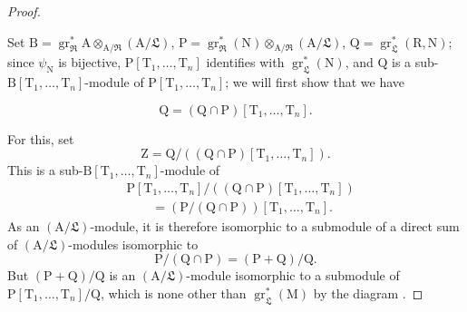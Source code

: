 \begin{proof}
\begin{env}[19.7.1.2]
\label{IV.19.7.1.2}
Set $\mathrm{B}=\operatorname{gr}_\mathfrak{R}^*\mathrm{A}\otimes_{\mathrm{A}/\mathfrak{R}}(\mathrm{A}/\mathfrak{L})$, $\mathrm{P}=\operatorname{gr}_\mathfrak{R}^*(\mathrm{N})\otimes_{\mathrm{A}/\mathfrak{R}}(\mathrm{A}/\mathfrak{L})$, $\mathrm{Q}=\operatorname{gr}_\mathfrak{L}^*(\mathrm{R},\mathrm{N})$; since $\psi_\mathrm{N}$ is bijective, $\mathrm{P}[\mathrm{T}_1,\ldots,\mathrm{T}_n]$ identifies with $\operatorname{gr}_\mathfrak{L}^*(\mathrm{N})$, and $\mathrm{Q}$ is a sub-$\mathrm{B}[\mathrm{T}_1,\ldots,\mathrm{T}_n]$-module of $\mathrm{P}[\mathrm{T}_1,\ldots,\mathrm{T}_n]$; we will first show that we have
\end{env}
\begin{env}[19.7.1.3]
\label{IV.19.7.1.3}
\[
  \mathrm{Q}=(\mathrm{Q}\cap\mathrm{P})[\mathrm{T}_1,\ldots,\mathrm{T}_n].
\]
\end{env}

For this, set
\[
  \mathrm{Z}=\mathrm{Q}/((\mathrm{Q}\cap\mathrm{P})[\mathrm{T}_1,\ldots,\mathrm{T}_n]).
\]
This is a sub-$\mathrm{B}[\mathrm{T}_1,\ldots,\mathrm{T}_n]$-module of
\[
  \begin{aligned}
  &\mathrm{P}[\mathrm{T}_1,\ldots,\mathrm{T}_n]
  /((\mathrm{Q}\cap\mathrm{P})[\mathrm{T}_1,\ldots,\mathrm{T}_n])\\
  &\qquad=(\mathrm{P}/(\mathrm{Q}\cap\mathrm{P}))[\mathrm{T}_1,\ldots,\mathrm{T}_n].
  \end{aligned}
\]
As an $(\mathrm{A}/\mathfrak{L})$-module, it is therefore isomorphic to a submodule of a direct sum of $(\mathrm{A}/\mathfrak{L})$-modules isomorphic to
\[
  \mathrm{P}/(\mathrm{Q}\cap\mathrm{P})=(\mathrm{P}+\mathrm{Q})/\mathrm{Q}.
\]
But $(\mathrm{P}+\mathrm{Q})/\mathrm{Q}$ is an $(\mathrm{A}/\mathfrak{L})$-module isomorphic to a submodule of $\mathrm{P}[\mathrm{T}_1,\ldots,\mathrm{T}_n]/\mathrm{Q}$, which is none other than $\operatorname{gr}_\mathfrak{L}^*(\mathrm{M})$ by the diagram .


\end{proof}
